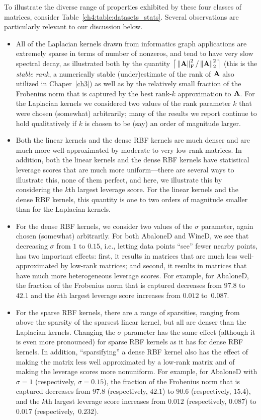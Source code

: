 To illustrate the diverse range of properties exhibited by these four classes
of matrices, consider Table~\ref{ch4:table:datasets_stats}.
Several observations are particularly relevant to our
discussion below.
\begin{itemize}
\item
All of the Laplacian kernels drawn from informatics graph applications are 
extremely sparse in terms of number of nonzeros, and tend to have 
very slow spectral decay, as illustrated both by the quantity 
$\big\lceil\left\|\mathbf{A}\right\|_\mathrm{F}^2/\left\|\mathbf{A}\right\|_2^2\big\rceil$ (this is the 
\emph{stable rank}, a numerically stable (under)estimate of the 
rank of $\mathbf{A}$ also utilized in Chaper~\ref{ch3}) as well as by the relatively small fraction of the 
Frobenius norm that is captured by the best rank-$k$ approximation to 
$\mathbf{A}$.
For the Laplacian kernels we considered two values of the rank parameter $k$ 
that were chosen (somewhat) arbitrarily; many of the results we report 
continue to hold qualitatively if $k$ is chosen to be (say) an order of 
magnitude larger. %
\item
Both the linear kernels and the dense RBF kernels are much denser and are 
much more well-approximated by moderate to very low-rank matrices.
In addition, both the linear kernels and the dense RBF kernels have 
statistical leverage scores that are much more uniform---there are several 
ways to illustrate this, none of them perfect, and here, we illustrate this 
by considering the $k$th largest leverage score.
For the linear kernels and the dense RBF kernels, this quantity is one to
two orders of magnitude smaller than for the Laplacian kernels.
\item
For the dense RBF kernels, we consider two values of the $\sigma$ parameter, 
again chosen (somewhat) arbitrarily.
For both AbaloneD and WineD, we see that decreasing $\sigma$ from $1$ to 
$0.15$, i.e., letting data points ``see'' fewer nearby points, has two 
important effects:
first, it results in matrices that are much less well-approximated by 
low-rank matrices; and
second, it results in matrices that have much more heterogeneous leverage 
scores.
For example, for AbaloneD, the fraction of the Frobenius norm that is captured 
decreases from $97.8$ to $42.1$ and the $k$th largest leverage score 
increases from $0.012$ to~$0.087$.
\item
For the sparse RBF kernels, there are a range of sparsities, ranging from
above the sparsity of the sparsest linear kernel, but all are denser
than the Laplacian kernels.
Changing the $\sigma$ parameter has the same effect (although it is even 
more pronounced) for sparse RBF kernels as it has for dense RBF kernels.
In addition, ``sparsifying'' a dense RBF kernel also has the effect of 
making the matrix less well approximated by a low-rank matrix and of making
the leverage scores more nonuniform.
For example, for AbaloneD with $\sigma=1$ (respectively, $\sigma=0.15$), 
the fraction of the Frobenius norm that is captured decreases from $97.8$ 
(respectively, $42.1$) to $90.6$ (respectively, $15.4$), 
and the $k$th largest leverage score increases from $0.012$ 
(respectively, $0.087$) to $0.017$ (respectively,~$0.232$).
\end{itemize}
